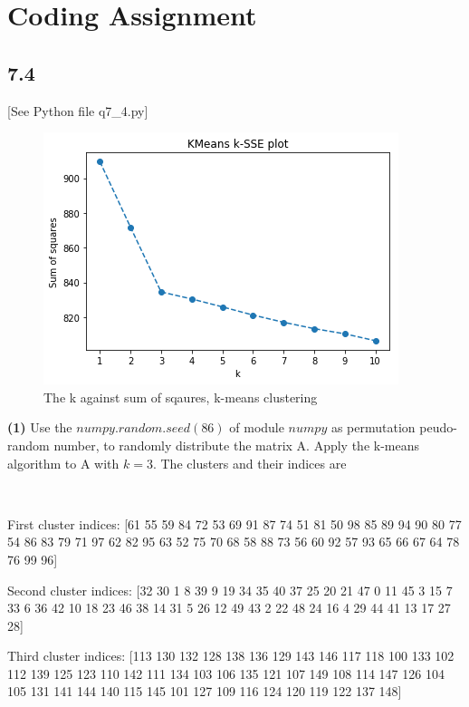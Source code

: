 \documentclass[a4paper, 11pt]{article}
\begin{document}
\newpage  
\section*{Coding Assignment}

\subsection*{7.4}

[See Python file q7\_4.py]\newline

\begin{figure}[htbp]
	\centering
	\includegraphics[scale=0.6]{figure2.png}
	\caption{The k against sum of sqaures, k-means clustering}
\end{figure}

\textbf{(1)} Use the $numpy.random.seed(86)$ of module $numpy$ as permutation peudo-random number, to randomly distribute the matrix A. Apply the k-means algorithm to A with $k = 3$. The clusters and their indices are

\

First cluster indices: [61 55 59 84 72 53 69 91 87 74 51 81 50 98 85 89 94 90 80 77 54 86 83 79 71 97 62 82 95 63 52 75 70 68 58 88 73 56 60 92 57 93 65 66 67 64 78 76 99 96]

Second cluster indices: [32 30  1  8 39  9 19 34 35 40 37 25 20 21 47  0 11 45  3 15  7 33  6 36 42 10 18 23 46 38 14 31  5 26 12 49 43  2 22 48 24 16  4 29 44 41 13 17
 27 28]

Third cluster indices: [113 130 132 128 138 136 129 143 146 117 118 100 133 102 112 139 125 123 110 142 111 134 103 106 135 121 107 149 108 114 147 126 104 105 131 141 144 140 115 145 101 127 109 116 124 120 119 122 137 148]
 
 \
 
\end{document}
